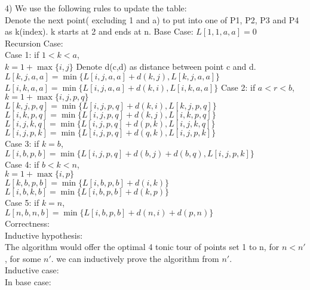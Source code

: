 \documentclass[12pt,letterpaper]{article}
\begin{document}
4) We use the following rules to update the table: \\
Denote the next point( excluding 1 and a) to put into one of P1, P2, P3 and P4 as k(index). k starts at 2 and ends at n.
Base Case:  $L[1,1,a,a]=0$ \\
Recursion Case: \\
Case 1: if $1<k<a$, \\
$k = 1+\max\{i,j\}$
Denote d(c,d) as distance between point c and d.
$L[k,j,a,a]= \min \{L[i,j,a,a] + d(k,j), L[k,j,a,a] \}$
$L[i,k,a,a]= \min \{L[i,j,a,a] + d(k,i), L[i,k,a,a] \}$
Case 2: if $a<r<b$, \\
$ k = 1+\max \{i,j,p,q \} $ \\
$L[k,j,p,q] = \min \{L[i,j,p,q] + d(k,i), L[k,j,p,q] \}$ \\ 
$L[i,k,p,q] = \min \{L[i,j,p,q] + d(k,j), L[i,k,p,q] \}$ \\
$L[i,j,k,q] = \min \{L[i,j,p,q] + d(p,k), L[i,j,k,q] \}$ \\
$L[i,j,p,k] = \min \{L[i,j,p,q] + d(q,k), L[i,j,p,k] \}$ \\
Case 3: if $k=b$, \\
$L[i,b,p,b] = \min \{ L[i,j,p,q] + d(b,j) + d(b,q), L[i,j,p,k] \}$ \\
Case 4: if $b<k<n$, \\
$k=1 + \max \{i,p\}$ \\
$L[k,b,p,b] = \min \{L[i,b,p,b] + d(i,k) \}$ \\
$L[i,b,k,b] = \min \{L[i,b,p,b] + d(k,p) \}$ \\
Case 5: if $k=n$, \\
$L[n,b,n,b] = \min \{L[i,b,p,b] + d(n,i) + d(p,n) \}$ \\
Correctness: \\
Inductive hypothesis: \\
The algorithm would offer the optimal 4 tonic tour of points set 1 to n, for $n < n'$, for some $n'$. we can inductively prove the algorithm from $n'$. \\
Inductive case: \\
In base case: \\
\end{document}
